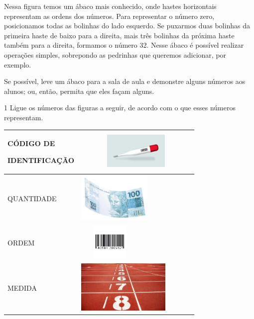 {Nessa figura temos um ábaco mais conhecido, onde hastes
horizontais representam as ordens dos números. Para representar o
número zero, posicionamos todas as bolinhas do lado esquerdo. Se
puxarmos duas bolinhas da primeira haste de baixo para a direita, mais
três bolinhas da próxima haste também para a direita, formamos o número
32. Nesse ábaco é possível realizar operações simples, sobrepondo as
pedrinhas que queremos adicionar, por exemplo.

Se possível, leve um ábaco para a sala de aula e demonstre
alguns números aos alunos; ou, então, permita que eles façam alguns.
}


\num{1} Ligue os números das figuras a seguir, de acordo com o que esses números representam.


\begin{longtable}[]{@{}ll@{}}
\toprule
\begin{minipage}[b]{0.48\columnwidth}\raggedright\strut
CÓDIGO DE

IDENTIFICAÇÃO\strut
\end{minipage} & \begin{minipage}[b]{0.48\columnwidth}\raggedright\strut
\includegraphics[width=2.28891in,height=0.67601in]{media/image3.jpeg}\strut
\end{minipage}\tabularnewline
\midrule
\endhead
QUANTIDADE &
\includegraphics[width=1.39514in,height=0.94497in]{media/image4.jpeg}\tabularnewline
ORDEM &
\includegraphics[width=1.19792in,height=0.69792in]{media/image5.jpeg}\tabularnewline
MEDIDA &
\includegraphics[width=1.75972in,height=0.98664in]{media/image6.jpeg}\tabularnewline
\bottomrule
\end{longtable}

